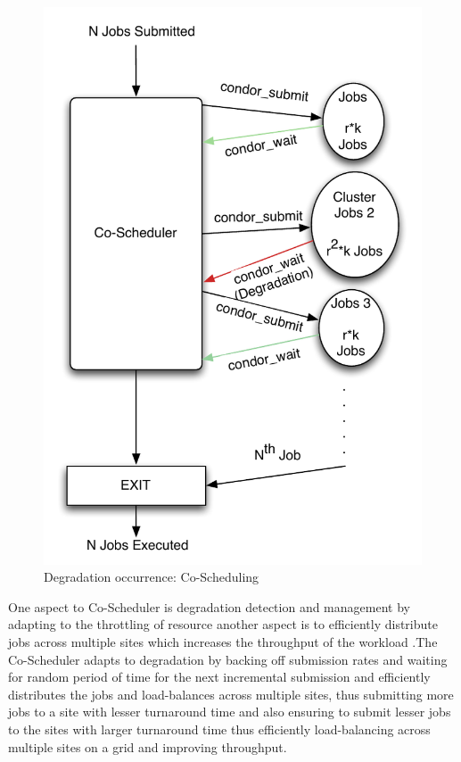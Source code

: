 \documentclass[ms,electronic,double]{nuthesis}
\begin{document}
\begin{figure}[htbp!]
\begin{center}
\includegraphics[scale=0.75]{images/degradation_detection}
\caption{Degradation occurrence: Co-Scheduling}
\label{fig:degradationdetect-intro}
\end{center}
\end{figure}

One aspect to Co-Scheduler is degradation detection and management by adapting 
to the throttling of resource another aspect is to efficiently distribute jobs 
across multiple sites which increases the throughput of the workload
.The Co-Scheduler adapts to degradation by backing off submission rates and waiting for random
period of time for the next incremental submission and efficiently 
distributes the jobs and load-balances across multiple sites, thus submitting more 
jobs to a site with lesser turnaround time and also ensuring to submit lesser 
jobs to the sites with larger turnaround time thus efficiently load-balancing 
across multiple sites on a grid and improving throughput.
\end{document}
